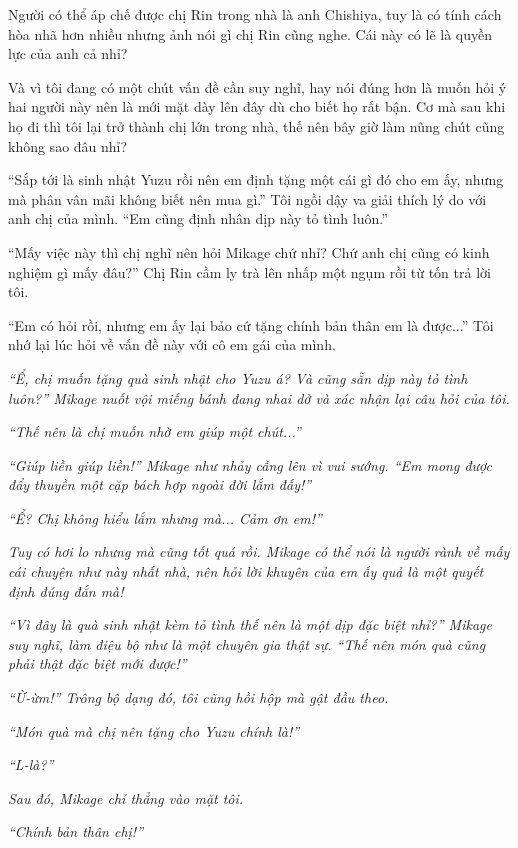 {Người có thể áp chế được chị Rin trong nhà là anh Chishiya, tuy là có
tính cách hòa nhã hơn nhiều nhưng ảnh nói gì chị Rin cũng nghe. Cái này
có lẽ là quyền lực của anh cả nhỉ?

Và vì tôi đang có một chút vấn đề cần suy nghĩ, hay nói đúng hơn là muốn
hỏi ý hai người này nên là mới mặt dày lên đây dù cho biết họ rất bận.
Cơ mà sau khi họ đi thì tôi lại trở thành chị lớn trong nhà, thế nên bây
giờ làm nũng chút cũng không sao đâu nhỉ?

``Sắp tới là sinh nhật Yuzu rồi nên em định tặng một cái gì đó cho em
ấy, nhưng mà phân vân mãi không biết nên mua gì.'' Tôi ngồi dậy va giải
thích lý do với anh chị của mình. ``Em cũng định nhân dịp này tỏ tình
luôn.''

``Mấy việc này thì chị nghĩ nên hỏi Mikage chứ nhỉ? Chứ anh chị cũng có
kinh nghiệm gì mấy đâu?'' Chị Rin cầm ly trà lên nhấp một ngụm rồi từ
tốn trả lời tôi.

``Em có hỏi rồi, nhưng em ấy lại bảo cứ tặng chính bản thân em là
được...'' Tôi nhớ lại lúc hỏi về vấn đề này với cô em gái của mình.

\emph{``Ể, chị muốn tặng quà sinh nhật cho Yuzu á? Và cũng sẵn dịp này
tỏ tình luôn?'' Mikage nuốt vội miếng bánh đang nhai dở và xác nhận lại
câu hỏi của tôi.}

\emph{``Thế nên là chị muốn nhờ em giúp một chút...''}

\emph{``Giúp liền giúp liền!'' Mikage như nhảy cẫng lên vì vui sướng.
``Em mong được đẩy thuyền một cặp bách hợp ngoài đời lắm đấy!''}

\emph{``Ể? Chị không hiểu lắm nhưng mà... Cảm ơn em!''}

\emph{Tuy có hơi lo nhưng mà cũng tốt quá rồi. Mikage có thể nói là
người rành về mấy cái chuyện như này nhất nhà, nên hỏi lời khuyên của em
ấy quả là một quyết định đúng đắn mà!}

\emph{``Vì đây là quà sinh nhật kèm tỏ tình thế nên là một dịp đặc biệt
nhỉ?'' Mikage suy nghĩ, làm điệu bộ như là một chuyên gia thật sự. ``Thế
nên món quà cũng phải thật đặc biệt mới được!''}

\emph{``Ừ-ừm!'' Trông bộ dạng đó, tôi cũng hồi hộp mà gật đầu theo.}

\emph{``Món quà mà chị nên tặng cho Yuzu chính là!''}

\emph{``L-là?''}

\emph{Sau đó, Mikage chỉ thẳng vào mặt tôi.}

\emph{``Chính bản thân chị!''}

}
